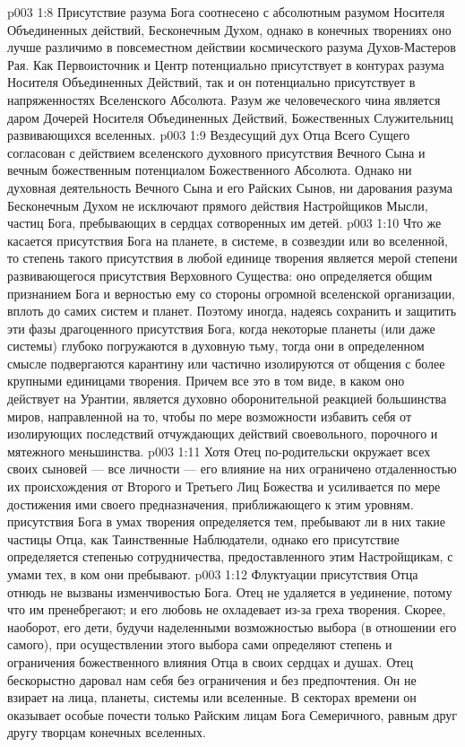 \vs p003 1:8 Присутствие разума Бога соотнесено с абсолютным разумом Носителя Объединенных действий, Бесконечным Духом, однако в конечных творениях оно лучше различимо в повсеместном действии космического разума Духов\hyp{}Мастеров Рая. Как Первоисточник и Центр потенциально присутствует в контурах разума Носителя Объединенных Действий, так и он потенциально присутствует в напряженностях Вселенского Абсолюта. Разум же человеческого чина является даром Дочерей Носителя Объединенных Действий, Божественных Служительниц развивающихся вселенных.
\vs p003 1:9 Вездесущий дух Отца Всего Сущего согласован с действием вселенского духовного присутствия Вечного Сына и вечным божественным потенциалом Божественного Абсолюта. Однако ни духовная деятельность Вечного Сына и его Райских Сынов, ни дарования разума Бесконечным Духом не исключают прямого действия Настройщиков Мысли, частиц Бога, пребывающих в сердцах сотворенных им детей.
\vs p003 1:10 Что же касается присутствия Бога на планете, в системе, в созвездии или во вселенной, то степень такого присутствия в любой единице творения является мерой степени развивающегося присутствия Верховного Существа: оно определяется общим признанием Бога и верностью ему со стороны огромной вселенской организации, вплоть до самих систем и планет. Поэтому иногда, надеясь сохранить и защитить эти фазы драгоценного присутствия Бога, когда некоторые планеты (или даже системы) глубоко погружаются в духовную тьму, тогда они в определенном смысле подвергаются карантину или частично изолируются от общения с более крупными единицами творения. Причем все это в том виде, в каком оно действует на Урантии, является духовно оборонительной реакцией большинства миров, направленной на то, чтобы по мере возможности избавить себя от изолирующих последствий отчуждающих действий своевольного, порочного и мятежного меньшинства.
\vs p003 1:11 \pc Хотя Отец по\hyp{}родительски окружает всех своих сыновей --- все личности --- его влияние на них ограничено отдаленностью их происхождения от Второго и Третьего Лиц Божества и усиливается по мере достижения ими своего предназначения, приближающего к этим уровням.  присутствия Бога в умах творения определяется тем, пребывают ли в них такие частицы Отца, как Таинственные Наблюдатели, однако его  присутствие определяется степенью сотрудничества, предоставленного этим Настройщикам, с умами тех, в ком они пребывают.
\vs p003 1:12 Флуктуации присутствия Отца отнюдь не вызваны изменчивостью Бога. Отец не удаляется в уединение, потому что им пренебрегают; и его любовь не охладевает из\hyp{}за греха творения. Скорее, наоборот, его дети, будучи наделенными возможностью выбора (в отношении его самого), при осуществлении этого выбора сами определяют степень и ограничения божественного влияния Отца в своих сердцах и душах. Отец бескорыстно даровал нам себя без ограничения и без предпочтения. Он не взирает на лица, планеты, системы или вселенные. В секторах времени он оказывает особые почести только Райским лицам Бога Семеричного, равным друг другу творцам конечных вселенных.
